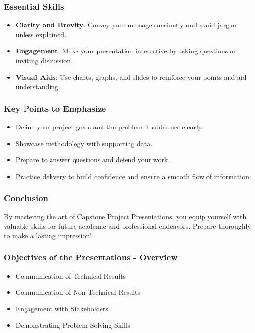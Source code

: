 \documentclass{beamer}
\begin{document}
\begin{frame}[fragile]
    \frametitle{Essential Skills}
    \begin{itemize}
        \item \textbf{Clarity and Brevity}: Convey your message succinctly and avoid jargon unless explained.
        \item \textbf{Engagement}: Make your presentation interactive by asking questions or inviting discussion.
        \item \textbf{Visual Aids}: Use charts, graphs, and slides to reinforce your points and aid understanding.
    \end{itemize}
\end{frame}

\begin{frame}[fragile]
    \frametitle{Key Points to Emphasize}
    \begin{itemize}
        \item Define your project goals and the problem it addresses clearly.
        \item Showcase methodology with supporting data.
        \item Prepare to answer questions and defend your work.
        \item Practice delivery to build confidence and ensure a smooth flow of information.
    \end{itemize}
\end{frame}

\begin{frame}[fragile]
    \frametitle{Conclusion}
    By mastering the art of Capstone Project Presentations, you equip yourself with valuable skills for future academic and professional endeavors. Prepare thoroughly to make a lasting impression!
\end{frame}

\begin{frame}[fragile]
    \frametitle{Objectives of the Presentations - Overview}
    \begin{itemize}
        \item Communication of Technical Results
        \item Communication of Non-Technical Results
        \item Engagement with Stakeholders
        \item Demonstrating Problem-Solving Skills
    \end{itemize}
\end{frame}
\end{document}
